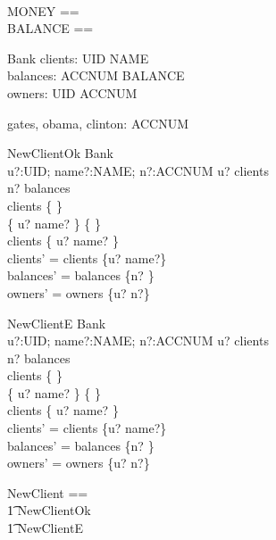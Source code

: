 \documentclass{article}
\begin{document}
\begin{zed}
 \\
MONEY == \nat \\
BALANCE == \nat
\end{zed}


\begin{schema}{Bank}
clients: UID \pfun NAME \\
balances: ACCNUM \pfun BALANCE \\
owners: UID \rel ACCNUM
\end{schema}

\begin{axdef}
gates, obama, clinton: ACCNUM
\end{axdef}



\begin{schema}{NewClientOk}
\Delta Bank \\
u?:UID; name?:NAME; 
n?:ACCNUM
\where
 u? \notin \dom clients \\
 n? \notin \dom balances \\
 clients \neq \{ \} \\
 \{ u? \mapsto name? \} \neq \{ \} \\
 clients \subset \{ u? \mapsto name? \} \\
clients' = clients \cup \{u? \mapsto name?\} \\
balances' = balances \cup \{n? \} \\
owners' = owners \cup \{u? \mapsto n?\}
\end{schema}

\begin{schema}{NewClientE}
\Delta Bank \\
u?:UID; name?:NAME; 
n?:ACCNUM
\where
 u? \in \dom clients \\
 n? \notin \dom balances \\
 clients \neq \{ \} \\
 \{ u? \mapsto name? \} \neq \{ \} \\
 clients \subset \{ u? \mapsto name? \} \\
clients' = clients \cup \{u? \mapsto name?\} \\
balances' = balances \cup \{n? \} \\
owners' = owners \cup \{u? \mapsto n?\}
\end{schema}

\begin{zed}
NewClient == \\
  \t1 NewClientOk \lor \\
  \t1 NewClientE
\end{zed}
\end{document}
